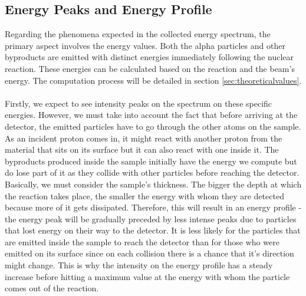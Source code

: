 \documentclass{article}
\begin{document}
\begin{multicols}{2}



\subsection{Energy Peaks and Energy Profile}
    \label{sec:energy_profile_peak}

Regarding the phenomena expected in the collected energy spectrum, the primary aspect involves the energy values.
Both the alpha particles and other byproducts are emitted with distinct energies immediately following the nuclear reaction.
These energies can be calculated based on the reaction and the beam's energy.
The computation process will be detailed in section \ref{sec:theoreticalvalues}.

\paragraph{}

Firstly, we expect to see intensity peaks on the spectrum on these specific energies.
However, we must take into account the fact that before arriving at the detector, the emitted particles have to go through the other atoms on the sample.
As an incident proton comes in, it might react with another proton from the material that sits on its surface but it can also react with one inside it.
The byproducts produced inside the sample initially have the energy we compute but do lose part of it as they collide with other particles before reaching the detector.
Basically, we must consider the sample's thickness. The bigger the depth at which the reaction takes place, the smaller the energy with whom they are detected because more of it gets dissipated.
Therefore, this will result in an energy profile - the energy peak will be gradually preceded by less intense peaks due to particles that lost energy on their way to the detector.
It is less likely for the particles that are emitted inside the sample to reach the detector than for those who were emitted on its surface since on each collision there is a chance that it's direction might change.
This is why the intensity on the energy profile has a steady increase before hitting a maximum value at the energy with whom the particle comes out of the reaction.


\end{multicols}
\end{document}
